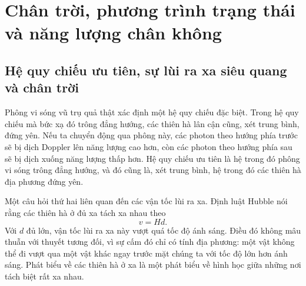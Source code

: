 \chapter{Chân trời, phương trình trạng thái và năng lượng chân không}

\section{Hệ quy chiếu ưu tiên, sự lùi ra xa siêu quang và chân trời}

Phông vi sóng vũ trụ quả thật xác định một hệ quy chiếu đặc biệt. Trong hệ quy chiếu mà bức xạ đó trông đẳng hướng, các thiên hà lân cận cũng, xét trung bình, đứng yên. Nếu ta chuyển động qua phông này, các photon theo hướng phía trước sẽ bị dịch Doppler lên năng lượng cao hơn, còn các photon theo hướng phía sau sẽ bị dịch xuống năng lượng thấp hơn. Hệ quy chiếu ưu tiên là hệ trong đó phông vi sóng trông đẳng hướng, và đó cũng là, xét trung bình, hệ trong đó các thiên hà địa phương đứng yên.

\begin{classroomqa}
\end{classroomqa}

Một câu hỏi thứ hai liên quan đến các vận tốc lùi ra xa. Định luật Hubble nói rằng các thiên hà ở đủ xa tách xa nhau theo
\begin{equation}
v = H d .
\end{equation}
Với \(d\) đủ lớn, vận tốc lùi ra xa này vượt quá tốc độ ánh sáng. Điều đó không mâu thuẫn với thuyết tương đối, vì sự cấm đó chỉ có tính địa phương: một vật không thể đi vượt qua một vật khác ngay trước mặt chúng ta với tốc độ lớn hơn ánh sáng. Phát biểu về các thiên hà ở xa là một phát biểu về hình học giữa những nơi tách biệt rất xa nhau.

\begin{classroomqa}
\end{classroomqa}

